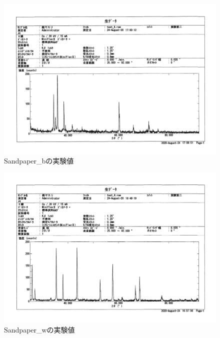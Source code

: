 \documentclass[a4paper,10.5pt]{ltjsarticle}
\begin{document}
\begin{figure}[h]
  \centering
  \includegraphics[scale=0.5,page=2]{Sandpaper_b.pdf}
  \vspace{-20pt}\caption{Sandpaper\_bの実験値}
  \label{fig:Sandpaper_b}
\end{figure}
\begin{figure}[h]
  \centering
  \includegraphics[scale=0.5,page=2]{Sandpaper_w.pdf}
  \vspace{-20pt}\caption{Sandpaper\_wの実験値}
  \label{fig:Sandpaper_w}
\end{figure}
\end{document}
